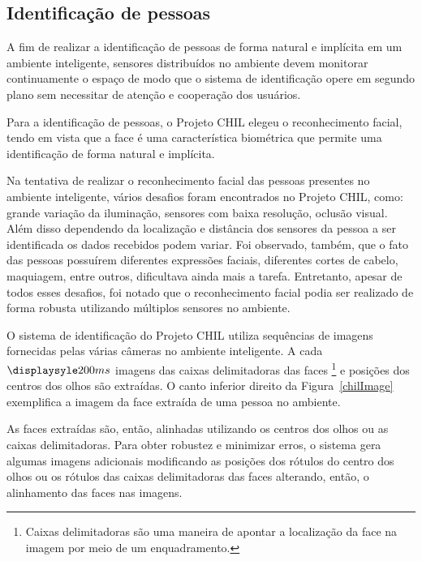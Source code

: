 \subsection{Identificação de pessoas}


A fim de realizar a identificação de pessoas de forma natural e implícita em um ambiente inteligente, sensores distribuídos no ambiente devem monitorar continuamente o espaço de modo que o sistema de identificação opere em segundo plano sem necessitar de atenção e cooperação dos usuários.

Para a identificação de pessoas, o Projeto CHIL elegeu o reconhecimento facial, tendo em vista que a face é uma característica biométrica que permite uma identificação de forma natural e implícita. 


Na tentativa de realizar o reconhecimento facial das pessoas presentes no ambiente inteligente, vários desafios foram encontrados no Projeto CHIL, como: grande variação da iluminação, sensores com baixa resolução, oclusão visual. Além disso dependendo da localização e distância dos sensores da pessoa a ser identificada os dados recebidos podem variar. Foi observado, também, que o fato das pessoas possuírem diferentes expressões faciais, diferentes cortes de cabelo, maquiagem, entre outros, dificultava ainda mais a tarefa. Entretanto, apesar de todos esses desafios, foi notado que o reconhecimento facial podia ser realizado de forma robusta utilizando múltiplos sensores no ambiente.

O sistema de identificação do Projeto CHIL utiliza sequências de imagens fornecidas pelas várias câmeras no ambiente inteligente. A cada $\displaysyle 200ms$ imagens das caixas delimitadoras das faces \footnote{Caixas delimitadoras são uma maneira de apontar a localização da face na imagem por meio de um enquadramento.} e posições dos centros dos olhos são extraídas. O canto inferior direito da Figura~\ref{chilImage} exemplifica a imagem da face extraída de uma pessoa no ambiente.

As faces extraídas são, então, alinhadas utilizando os centros dos olhos ou as caixas delimitadoras. Para obter robustez e minimizar erros, o sistema gera algumas imagens adicionais modificando as posições dos rótulos do centro dos olhos ou os rótulos das caixas delimitadoras das faces alterando, então, o alinhamento das faces nas imagens.

